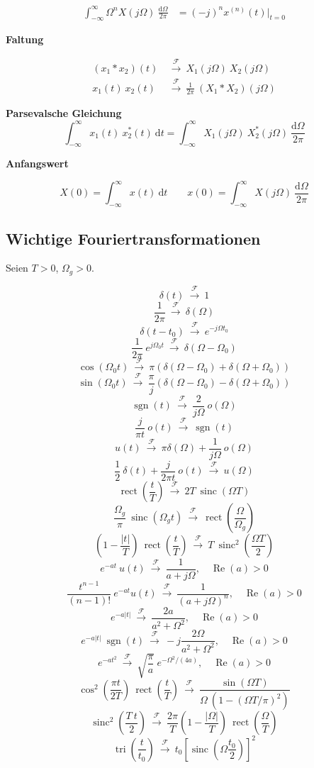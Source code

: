 \documentclass[10pt,a4paper]{article}
\newcommand{\fancyformula}[2]{
	\small
	\raggedright\sffamily\textbf{#1}
	#2
}
\newcommand{\ftransform}{
	~\xrightarrow{~\mathcal{F}~}~
}
\DeclareMathOperator{\sinc}{sinc}
\DeclareMathOperator{\sgn}{sgn}
\DeclareMathOperator{\rect}{rect}
\DeclareMathOperator{\tri}{tri}
\renewcommand{\Re}{\operatorname{Re}}
\begin{document}
\begin{multicols}{2}
{\begin{align*}
	\int_{-\infty}^{\infty}\Omega^n X(j\Omega) ~ \frac{\mathrm d\Omega}{2\pi}&=(-j)^n x^{(n)}(t) \bigg|_{t=0}
\end{align*}	
}
\fancyformula{Faltung}{
\begin{align*}
	(x_1 \ast x_2)(t) &\ftransform X_1(j\Omega) ~ X_2(j\Omega)\\
	x_1(t) ~ x_2(t) &\ftransform \frac{1}{2\pi} ~ (X_1 \ast X_2)(j\Omega)
\end{align*}
}
\fancyformula{Parsevalsche Gleichung}{\[ \int_{-\infty}^{\infty} x_1(t) ~ x_2^*(t) ~ \mathrm dt = \int_{-\infty}^{\infty}X_1(j\Omega) ~ X_2^*(j\Omega) ~ \frac{\mathrm d\Omega}{2\pi} \]}

\fancyformula{Anfangswert}{
	\[ X(0) = \int_{-\infty}^{\infty} x(t) ~ \mathrm dt \qquad x(0)=\int_{-\infty}^{\infty} X(j\Omega) ~ \frac{\mathrm d\Omega}{2\pi} \]	
}
\end{multicols}
\newpage

\subsection*{Wichtige Fouriertransformationen}
Seien $T>0$, $\Omega_g>0$.
\begin{multicols}{2}
	\small
	\[ \delta(t) \ftransform 1 \]
	\[ \frac{1}{2 \pi} \ftransform \delta(\Omega) \]
	\[ \delta(t - t_0) \ftransform e^{-j\Omega t_0} \]
	\[ \frac{1}{2 \pi} ~ e^{j \Omega_0 t} \ftransform \delta(\Omega - \Omega_0) \]
	\[ \cos(\Omega_0 t) \ftransform \pi \left( \delta(\Omega - \Omega_0) + \delta(\Omega + \Omega_0) \right) \]
	\[ \sin(\Omega_0 t) \ftransform \frac{\pi}{j} \left( \delta(\Omega - \Omega_0) - \delta(\Omega + \Omega_0) \right) \]
	\[ \sgn(t) \ftransform \frac{2}{j \Omega} ~ o(\Omega) \]
	\[ \frac{j}{\pi t} ~ o(t) \ftransform \sgn(t) \]
	\[ u(t) \ftransform \pi \delta(\Omega) + \frac{1}{j \Omega} ~ o(\Omega) \]
	\[ \frac{1}{2} ~ \delta(t) + \frac{j}{2 \pi t} ~ o(t) \ftransform u(\Omega) \]
	\[ \rect \left(\frac{t}{T} \right) \ftransform 2 T ~ \sinc(\Omega T) \]
	\[ \frac{\Omega_g}{\pi} ~ \sinc(\Omega_g t) \ftransform \rect \left( \frac{\Omega}{\Omega_g} \right) \]
	\[ \left(1 - \frac{|t|}{T} \right) ~ \rect \left(\frac{t}{T} \right) \ftransform T ~ \sinc^2 \left( \frac{\Omega T}{2} \right) \]
	\[ e^{-at} ~ u(t) \ftransform \frac{1}{a+j\Omega},\quad \Re(a)>0 \]
	\[ \frac{t^{n-1}}{(n-1)!} ~ e^{-at}u(t) \ftransform \frac{1}{(a+j\Omega)^n},\quad \Re(a)>0 \]
	\[ e^{-a |t|} \ftransform \frac{2a}{a^2+\Omega^2},\quad \Re(a)>0\]
	\[ e^{-a |t|} ~ \sgn(t) \ftransform -j\frac{2\Omega}{a^2+\Omega^2},\quad \Re(a)>0 \]
	\[ e^{-at^2} \ftransform \sqrt{\frac{\pi}{a}}~e^{-\Omega^2/(4a)},\quad \Re(a)>0 \]
	\[ \cos^2\left(\frac{\pi t}{2T}\right)~\rect\left(\frac{t}{T}\right) \ftransform \frac{\sin(\Omega T)}{\Omega ~ (1-(\Omega T/\pi)^2)} \]
	\[ \sinc^2\left(\frac{T~t}{2}\right) \ftransform \frac{2\pi}{T}\left(1-\frac{|\Omega|}{T}\right)~\rect\left(\frac{\Omega}{T}\right) \]
	\[ \tri\left(\frac{t}{t_0}\right) \ftransform t_0\left[\sinc\left(\Omega\frac{t_0}{2}\right)\right]^2 \]
\end{multicols}
\end{document}
